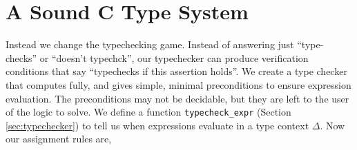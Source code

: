 \documentclass{puthesis}
\begin{document}





\section{A Sound C Type System}

Instead we change the typechecking game.  Instead of answering just
``type-checks'' or ``doesn't typechck'', our typechecker can produce
verification conditions that say ``typechecks if this assertion
holds''. We create a type checker that computes fully, and gives
simple, minimal preconditions to ensure expression evaluation. The
preconditions may not be decidable, but they are left to the user of
the logic to solve. We define a function \lstinline|typecheck_expr|
(Section \ref{sec:typechecker}) to tell us when expressions evaluate
in a type context $\Delta$.
Now our assignment rules are,
\end{document}
